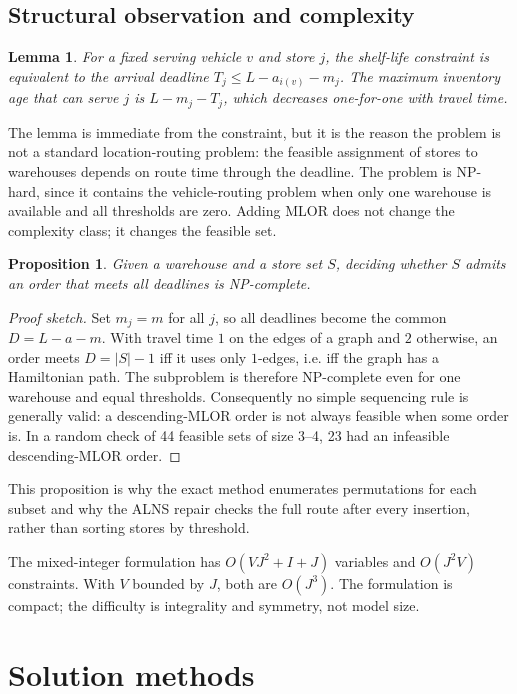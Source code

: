 \documentclass[preprint,12pt]{elsarticle}
\newtheorem{lemma}{Lemma}
\newtheorem{proposition}{Proposition}
\begin{document}
\subsection{Structural observation and complexity}

\begin{lemma}
For a fixed serving vehicle $v$ and store $j$, the shelf-life constraint is equivalent to the arrival deadline $T_j\le L-a_{i(v)}-m_j$. The maximum inventory age that can serve $j$ is $L-m_j-T_j$, which decreases one-for-one with travel time.
\end{lemma}

The lemma is immediate from the constraint, but it is the reason the problem is not a standard location-routing problem: the feasible assignment of stores to warehouses depends on route time through the deadline. The problem is NP-hard, since it contains the vehicle-routing problem when only one warehouse is available and all thresholds are zero. Adding MLOR does not change the complexity class; it changes the feasible set.

\begin{proposition}
Given a warehouse and a store set $S$, deciding whether $S$ admits an order that meets all deadlines is NP-complete.
\end{proposition}

\begin{proof}[Proof sketch]
Set $m_j=m$ for all $j$, so all deadlines become the common $D=L-a-m$. With travel time $1$ on the edges of a graph and $2$ otherwise, an order meets $D=|S|-1$ iff it uses only $1$-edges, i.e. iff the graph has a Hamiltonian path. The subproblem is therefore NP-complete even for one warehouse and equal thresholds. Consequently no simple sequencing rule is generally valid: a descending-MLOR order is not always feasible when some order is. In a random check of 44 feasible sets of size 3--4, 23 had an infeasible descending-MLOR order.
\end{proof}

This proposition is why the exact method enumerates permutations for each subset and why the ALNS repair checks the full route after every insertion, rather than sorting stores by threshold.

The mixed-integer formulation has $O(VJ^2+I+J)$ variables and $O(J^2V)$ constraints. With $V$ bounded by $J$, both are $O(J^3)$. The formulation is compact; the difficulty is integrality and symmetry, not model size.

\section{Solution methods}
\end{document}
